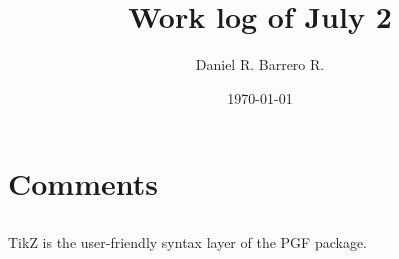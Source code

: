 \documentclass{amsart}
\title{Work log of July 2}
\author{Daniel R. Barrero R.}
\date{\today}
\begin{document}
\maketitle

\section{Comments}

\subsection{} TikZ is the user-friendly syntax layer of the PGF package.

\end{document}
